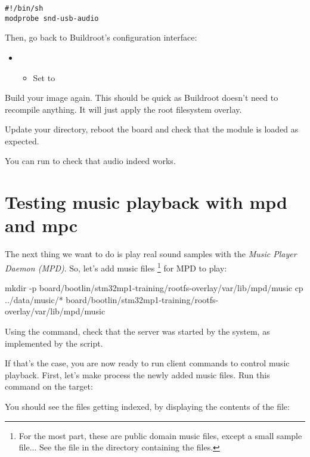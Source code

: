 \begin{verbatim}
#!/bin/sh
modprobe snd-usb-audio
\end{verbatim}

Then, go back to Buildroot's configuration interface:
\begin{itemize}
\item {}
  \begin{itemize}
  \item Set  to
  \end{itemize}
\end{itemize}

Build your image again. This should be quick as Buildroot doesn't need
to recompile anything. It will just apply the root filesystem overlay.

Update your  directory, reboot the board and check
that the  module is loaded as expected.

You can run  to check that audio indeed works.

\section{Testing music playback with mpd and mpc}

The next thing we want to do is play real sound samples with
the {\em Music Player Daemon (MPD)}. So, let's add music files
\footnote{For the most part, these are public domain
music files, except a small sample file... See the 
file in the directory containing the files.}
for MPD to play:

\begin{bashinput}
mkdir -p board/bootlin/stm32mp1-training/rootfs-overlay/var/lib/mpd/music
cp ../data/music/* board/bootlin/stm32mp1-training/rootfs-overlay/var/lib/mpd/music
\end{bashinput}

Using the  command, check that the  server
was started by the system, as implemented by the
 script.

If that's the case, you are now ready to run  client commands
to control music playback. First, let's make  process the
newly added music files. Run this command on the target:


You should see the files getting indexed, by displaying the contents
of the  file:

